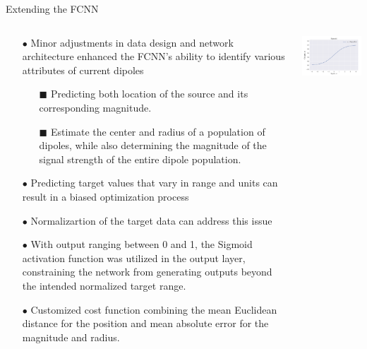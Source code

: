 \documentclass[aspectratio=169, 9pt]{beamer}
\begin{document}
\begin{frame}{Extending the FCNN}
  \begin{columns}
    \begin{column}{0.5\textwidth}
      \begin{itemize}
          \item[$\bullet$] Minor adjustments in data design and network architecture enhanced the FCNN’s ability to identify various attributes of current dipoles
          \begin{itemize}
            \item[\tiny$\blacksquare$] Predicting both location of the source and its corresponding magnitude.
            \item[\tiny$\blacksquare$] Estimate the center and radius of a population of dipoles, while also determining the magnitude of the signal strength of the entire dipole population.
          \end{itemize}
          \item[$\bullet$] Predicting target values that vary in range and units can result in a biased optimization process
          \item[$\bullet$] Normalizartion of the target data can address this issue
          \item[$\bullet$] With output ranging between 0 and 1, the Sigmoid activation function was utilized in the output layer, constraining the network from generating outputs beyond the intended normalized target range.
          \item[$\bullet$] Customized cost function combining the mean Euclidean distance for the position and mean absolute error for the magnitude and radius.
    \end{itemize}
    \end{column}
    \begin{column}{0.5\textwidth}
      \includegraphics[width=7cm]{figures/sigmoid.png}
    \end{column}
  \end{columns}
\end{frame}
\end{document}
